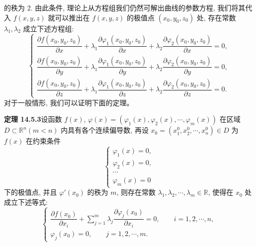 \documentclass[UTF8,12pt,a4paper,fontset=fandol]{ctexart}
\begin{document}
的秩为 $2$. 由此条件, 理论上从方程组我们仍然可解出曲线的参数方程, 我们将其代入 $f(x,y,z)$ 就可以推出在 $f(x,y,z)$ 的极值点 $(x_0,y_0,z_0)$ 处, 存在常数 $\lambda_1,\lambda_2$ 成立下述方程组:
\[
  \begin{cases}
    \dfrac{\partial f(x_0,y_0,z_0)}{\partial x}
    +\lambda_1\dfrac{\partial\varphi_1(x_0,y_0,z_0)}{\partial x}
    +\lambda_2\dfrac{\partial\varphi_2(x_0,y_0,z_0)}{\partial x}=0,\\[1.2ex]
    \dfrac{\partial f(x_0,y_0,z_0)}{\partial y}
    +\lambda_1\dfrac{\partial\varphi_1(x_0,y_0,z_0)}{\partial y}
    +\lambda_2\dfrac{\partial\varphi_2(x_0,y_0,z_0)}{\partial y}=0,\\[1.2ex]
    \dfrac{\partial f(x_0,y_0,z_0)}{\partial z}
    +\lambda_1\dfrac{\partial\varphi_1(x_0,y_0,z_0)}{\partial z}
    +\lambda_2\dfrac{\partial\varphi_2(x_0,y_0,z_0)}{\partial z}=0.
  \end{cases}
\]
对于一般情形, 我们可以证明下面的定理。

\noindent\textbf{定理 14.5.3}\quad 设函数 $f(x)$, $\varphi(x)=(\varphi_1(x),\varphi_2(x),\cdots,\varphi_m(x))$ 在区域 $D\subset\mathbb R^n(m<n)$ 内具有各个连续偏导数, 再设 $x_0=(x_1^0,x_2^0,\cdots,x_n^0)\in D$ 为 $f(x)$ 在约束条件
\begin{equation}
  \begin{cases}
    \varphi_1(x)=0,\\
    \varphi_2(x)=0,\\
    \cdots\\
    \varphi_m(x)=0
  \end{cases}
  \tag{14.5.1}
\end{equation}
下的极值点, 并且 $\varphi'(x_0)$ 的秩为 $m$, 则存在常数 $\lambda_1,\lambda_2,\cdots,\lambda_m\in\mathbb R$, 使得在 $x_0$ 处成立下述等式:
\begin{equation}
  \begin{cases}
    \dfrac{\partial f(x_0)}{\partial x_i}
    +\displaystyle\sum_{j=1}^m\lambda_j
    \dfrac{\partial\varphi_j(x_0)}{\partial x_i}=0,
    \qquad i=1,2,\cdots,n,\\[1.2ex]
    \varphi_j(x_0)=0,\qquad j=1,2,\cdots,m.
  \end{cases}
  \tag{14.5.2}
\end{equation}
\end{document}
